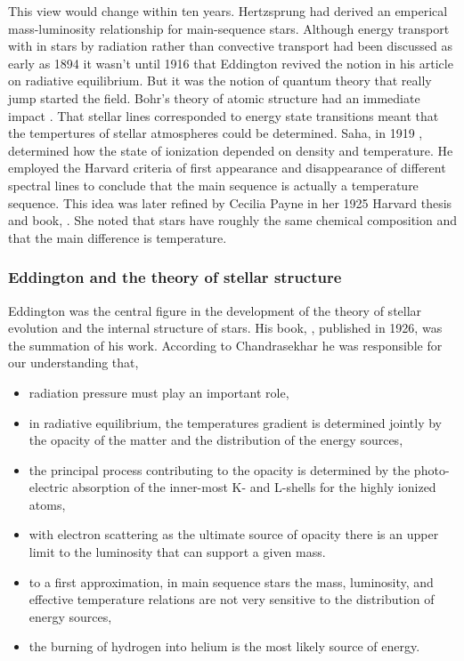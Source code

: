 This  view would change within ten
years. Hertzsprung \cite{Hertzsprung1919} had derived an emperical
mass-luminosity relationship for main-sequence stars. Although energy
transport with in stars by radiation rather than convective transport
had been discussed as early as 1894 it wasn't until 1916 that
Eddington \cite{Eddington1916} revived the notion in his article on
radiative equilibrium. But it was the notion of quantum theory that
really jump started the field. Bohr's theory of atomic structure had
an immediate impact \cite{Bohr1913}. That stellar lines corresponded
to energy state transitions meant that the tempertures of stellar
atmospheres could be determined. Saha, in 1919 \cite{Saha1919},
determined how the state of ionization depended on density and
temperature. He employed the Harvard criteria of first appearance and
disappearance of different spectral lines to conclude that the main
sequence is actually a temperature sequence. This idea was later
refined by Cecilia Payne  in her 1925 Harvard
thesis and book,  \cite{Payne1925}. She noted
that stars have roughly the same chemical composition and that the
main difference is temperature.

\subsubsection{Eddington and the theory of stellar structure}

Eddington was the central figure in the development of the theory of
stellar evolution and the internal structure of stars. His
book, , published in
1926, was the summation of his work. According to Chandrasekhar
he was responsible for our understanding that,
\begin{itemize}
\item radiation pressure must play an important role,
\item in radiative equilibrium, the temperatures gradient is
      determined jointly by the opacity of the matter and the
      distribution of the energy sources,
\item the principal process contributing to the opacity is
      determined by the photo-electric absorption of the inner-most K-
      and L-shells for the highly ionized atoms,
\item with electron scattering as the ultimate source of opacity
      there is an upper limit to the luminosity that can support a
      given mass.
\item to a first approximation, in main sequence stars the mass, luminosity,
      and effective temperature relations are not very sensitive to
      the distribution of energy sources,
\item the burning of hydrogen into helium is the most likely source of
      energy.
\end{itemize}
      
